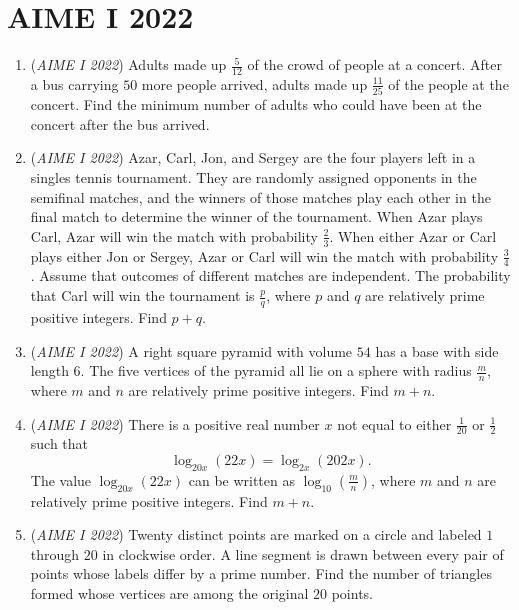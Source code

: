 \section{AIME I 2022}
        \begin{enumerate}
        	\item (\textit{AIME I 2022}) Adults made up $\frac5{12}$ of the crowd of people at a concert. After a bus carrying $50$ more people arrived, adults made up $\frac{11}{25}$ of the people at the concert. Find the minimum number of adults who could have been at the concert after the bus arrived.


 

	\item (\textit{AIME I 2022}) Azar, Carl, Jon, and Sergey are the four players left in a singles tennis tournament. They are randomly assigned opponents in the semifinal matches, and the winners of those matches play each other in the final match to determine the winner of the tournament. When Azar plays Carl, Azar will win the match with probability $\frac23$. When either Azar or Carl plays either Jon or Sergey, Azar or Carl will win the match with probability $\frac34$. Assume that outcomes of different matches are independent. The probability that Carl will win the tournament is $\frac{p}{q}$, where $p$ and $q$ are relatively prime positive integers. Find $p+q$.


 

	\item (\textit{AIME I 2022}) A right square pyramid with volume $54$ has a base with side length $6.$ The five vertices of the pyramid all lie on a sphere with radius $\frac mn$, where $m$ and $n$ are relatively prime positive integers. Find $m+n$.


 

	\item (\textit{AIME I 2022}) There is a positive real number $x$ not equal to either $\frac{1}{20}$ or $\frac{1}{2}$ such that
 \[\log_{20x} (22x)=\log_{2x} (202x).\]The value $\log_{20x} (22x)$ can be written as $\log_{10} (\frac{m}{n})$, where $m$ and $n$ are relatively prime positive integers. Find $m+n$.


 

	\item (\textit{AIME I 2022}) Twenty distinct points are marked on a circle and labeled $1$ through $20$ in clockwise order. A line segment is drawn between every pair of points whose labels differ by a prime number. Find the number of triangles formed whose vertices are among the original $20$ points.



\end{enumerate}
